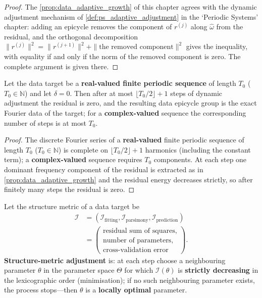\begin{proof}
The \cref{prop:data_adaptive_growth} of this chapter agrees with the dynamic adjustment mechanism of \cref{def:ps_adaptive_adjustment} in the `Periodic Systems' chapter:
adding an epicycle removes the component of $r^{(j)}$ along $\hat\omega$ from the residual, and the orthogonal decomposition
$\|r^{(j)}\|^2=\|r^{(j+1)}\|^2+\|\text{the removed component}\|^2$ gives the inequality,
with equality if and only if the norm of the removed component is zero. The complete argument is given there.
\end{proof}

\begin{theorem}\label{thm:data_adaptive_convergence}
Let the data target be a \textbf{real-valued finite periodic sequence} of length $T_0$ ($T_0\in\mathbb N$) and let $\delta=0$. Then after at most $\lfloor T_0/2\rfloor+1$ steps of dynamic adjustment the residual is zero, and the resulting data epicycle group is the exact Fourier data of the target; for a \textbf{complex-valued} sequence the corresponding number of steps is at most $T_0$.
\end{theorem}

\begin{proof}
The discrete Fourier series of a \textbf{real-valued} finite periodic sequence of length $T_0$ ($T_0\in\mathbb N$) is complete on $\lfloor T_0/2\rfloor+1$ harmonics (including the constant term); a \textbf{complex-valued} sequence requires $T_0$ components. At each step one dominant frequency component of the residual is extracted as in \cref{prop:data_adaptive_growth} and the residual energy decreases strictly, so after finitely many steps the residual is zero.
\end{proof}

\begin{definition}\label{def:data_structure_metric_adjustment}
Let the structure metric of a data target be
\[
\begin{aligned}
\mathcal I
&=(\mathcal I_{\text{fitting}},\mathcal I_{\text{parsimony}},\mathcal I_{\text{prediction}})\\
&=\left(\begin{array}{l}
\text{residual sum of squares},\\
\text{number of parameters},\\
\text{cross-validation error}
\end{array}\right).
\end{aligned}
\]
\textbf{Structure-metric adjustment} is: at each step choose a neighbouring parameter $\theta$ in the parameter space $\Theta$ for which $\mathcal I(\theta)$ is \textbf{strictly decreasing} in the lexicographic order (minimisation); if no such neighbouring parameter exists, the process stops---then $\theta$ is a \textbf{locally optimal} parameter.
\end{definition}

